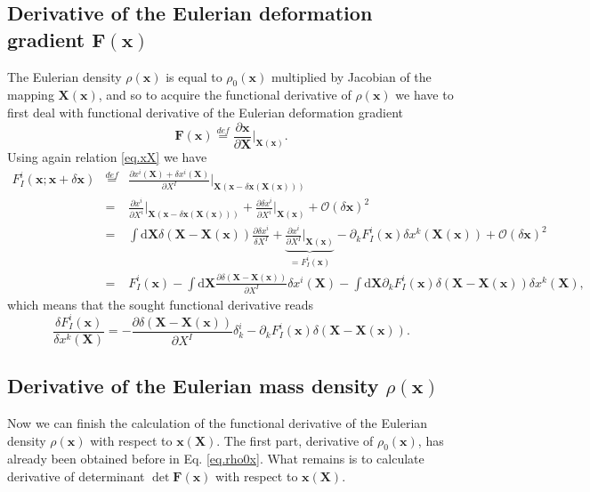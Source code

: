 \documentclass[
10pt, %
a4paper, %
oneside, %
headinclude,footinclude, %
BCOR5mm, %
]{scrartcl}
\newcommand{\xx}{\mathbf{x}}
\newcommand{\XX}{\mathbf{X}}
\newcommand{\dX}{\mathrm{d}\XX}
\newcommand{\OBig}{\mathcal{O}}
\newcommand{\FF}{\mathbf{F}}
\begin{document}
\subsection{Derivative of the Eulerian deformation gradient $\FF(\xx)$}
The Eulerian density $\rho(\xx)$ is equal to $\rho_0(\xx)$ multiplied by Jacobian of the mapping $\XX(\xx)$, and so to acquire the functional derivative of $\rho(\xx)$ we have to first  deal with functional derivative of the Eulerian deformation gradient
\begin{equation}
	\FF(\xx)\stackrel{def}{=}\frac{\partial \xx}{\partial \XX}\Big|_{\XX(\xx)}.
\end{equation}
Using again relation \eqref{eq.xX} we have
\begin{eqnarray}
	F^i_I(\xx;\xx+\delta\xx) &\stackrel{def}{=}&\frac{\partial x^i(\XX) +\delta x^i(\XX)}{\partial X^I}\Big|_{\XX(\xx-\delta\xx(\XX(\xx)))}\\
	&=&\frac{\partial x^i}{\partial X^i}\Big|_{\XX(\xx-\delta\xx(\XX(\xx)))} + \frac{\partial \delta x^i}{\partial X^i}\Big|_{\XX(\xx)}+\OBig(\delta\xx)^2\nonumber\\
	&=&\int\dX\delta(\XX-\XX(\xx)) \frac{\partial \delta x^i}{\delta X^I} +\underbrace{\frac{\partial x^i}{\partial X^I}\Big|_{\XX(\xx)}}_{=F^i_I(\xx)} -\partial_k F^i_I(\xx)\delta x^k(\XX(\xx)) + \OBig(\delta\xx)^2\nonumber\\
	&=&F^i_I(\xx) - \int\dX\frac{\partial \delta(\XX-\XX(\xx))}{\partial X^I}\delta x^i(\XX) -\int\dX\partial_k F^i_I(\xx)\delta(\XX-\XX(\xx))\delta x^k(\XX),\nonumber
\end{eqnarray}
which means that the sought functional derivative reads
\begin{equation}
	\frac{\delta F^i_I(\xx)}{\delta x^k(\XX)} = 
	- \frac{\partial \delta(\XX-\XX(\xx))}{\partial X^I}\delta^i_k -\partial_k F^i_I(\xx)\delta(\XX-\XX(\xx)).
\end{equation}

\subsection{Derivative of the Eulerian mass density $\rho(\xx)$}
Now we can finish the calculation of the functional derivative of the Eulerian density $\rho(\xx)$ with respect to $\xx(\XX)$. The first part, derivative of $\rho_0(\xx)$, has already been obtained before in Eq. \eqref{eq.rho0x}. What remains is to calculate derivative of determinant $\det \FF(\xx)$ with respect to $\xx(\XX)$. 
\end{document}
